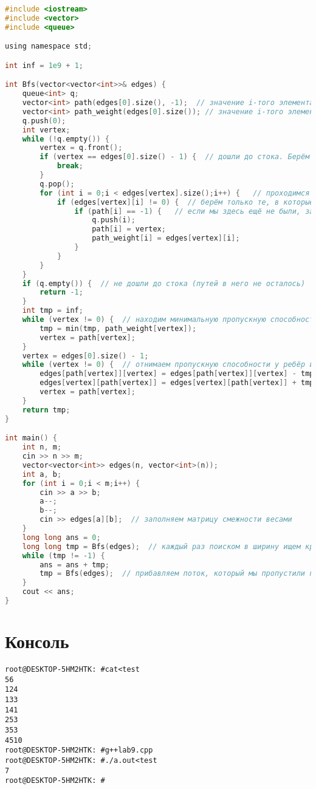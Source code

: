 \begin{lstlisting}[language=C]
#include <iostream>
#include <vector>
#include <queue>

using namespace std;

int inf = 1e9 + 1;

int Bfs(vector<vector<int>>& edges) {
	queue<int> q;
	vector<int> path(edges[0].size(), -1);  // значение i-того элемента показывает, из какой вершины попали в вершину i
	vector<int> path_weight(edges[0].size()); // значение i-того элемента показывает, сколько потока может пройти в вершину i
	q.push(0);
	int vertex;
	while (!q.empty()) {
		vertex = q.front();
		if (vertex == edges[0].size() - 1) {  // дошли до стока. Берём самый короткий путь (а в обходе в ширину эо самый первый найденный)
			break;
		}
		q.pop();
		for (int i = 0;i < edges[vertex].size();i++) {   // проходимся по всем вершинам из списка вмежности для  вершины vertex
			if (edges[vertex][i] != 0) {  // берём только те, в которые можем попасть
				if (path[i] == -1) {   // если мы здесь ещё не были, заходим сюда
					q.push(i);
					path[i] = vertex;
					path_weight[i] = edges[vertex][i];
				}
			}
		}
	}
	if (q.empty()) {  // не дошли до стока (путей в него не осталось)
		return -1;
	}
	int tmp = inf;
	while (vertex != 0) {  // находим минимальную пропускную способность в нашем пути
		tmp = min(tmp, path_weight[vertex]);
		vertex = path[vertex];
	}
	vertex = edges[0].size() - 1;
	while (vertex != 0) {  // отнимаем пропускную способности у ребёр из пути и прибавляем её же обратным
		edges[path[vertex]][vertex] = edges[path[vertex]][vertex] - tmp;
		edges[vertex][path[vertex]] = edges[vertex][path[vertex]] + tmp;
		vertex = path[vertex];
	}
	return tmp;
}

int main() {
	int n, m;
	cin >> n >> m;
	vector<vector<int>> edges(n, vector<int>(n));
	int a, b;
	for (int i = 0;i < m;i++) {
		cin >> a >> b;
		a--;
		b--;
		cin >> edges[a][b];  // заполняем матрицу смежности весами
	}
	long long ans = 0;
	long long tmp = Bfs(edges);  // каждый раз поиском в ширину ищем кратчайший по длине рёбер путь
	while (tmp != -1) {
		ans = ans + tmp;
		tmp = Bfs(edges);  // прибавляем поток, который мы пропустили по найденному пути
	}
	cout << ans;
}
\end{lstlisting}


\section{Консоль}
\begin{alltt}
root@DESKTOP-5HM2HTK:~# cat <test
5 6
1 2 4
1 3 3
1 4 1
2 5 3
3 5 3
4 5 10
root@DESKTOP-5HM2HTK:~# g++ lab9.cpp
root@DESKTOP-5HM2HTK:~# ./a.out <test
7
root@DESKTOP-5HM2HTK:~#
\end{alltt}
\pagebreak


